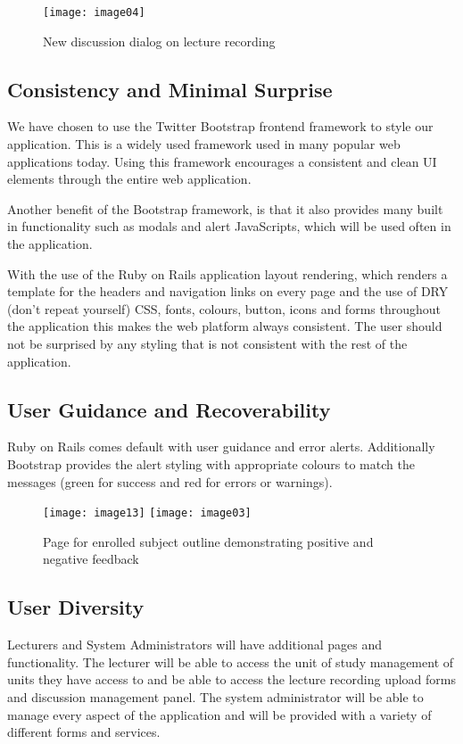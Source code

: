 \documentclass{article}
\begin{document}
\begin{figure}[h!]
\centering
\texttt{[image: image04]}
\caption{New discussion dialog on lecture recording}
\end{figure}

\subsection{Consistency and Minimal Surprise}
We have chosen to use the Twitter Bootstrap frontend framework to style our application. This is a widely used framework used in many popular web applications today. Using this framework encourages a consistent and clean UI elements through the entire web application. 

Another benefit of the Bootstrap framework, is that it also provides many built in functionality such as modals and alert JavaScripts, which will be used often in the application.

With the use of the Ruby on Rails application layout rendering, which renders a template for the headers and navigation links on every page and the use of DRY (don't repeat yourself) CSS, fonts, colours, button, icons and forms throughout the application this makes the web platform always consistent. The user should not be surprised by any styling that is not consistent with the rest of the application.

\clearpage
\subsection{User Guidance and Recoverability}
Ruby on Rails comes default with user guidance and error alerts. Additionally Bootstrap provides the alert styling with appropriate colours to match the messages (green for success and red for errors or warnings). 

\begin{figure}[h!]
\centering
\texttt{[image: image13]}
\texttt{[image: image03]}
\caption{Page for enrolled subject outline demonstrating positive and negative feedback}
\end{figure}

\subsection{User Diversity}
Lecturers and System Administrators will have additional pages and functionality. The lecturer will be able to access the unit of study management of units they have access to and be able to access the lecture recording upload forms and discussion management panel. The system administrator will be able to manage every aspect of the application and will be provided with a variety of different forms and services.
\end{document}
